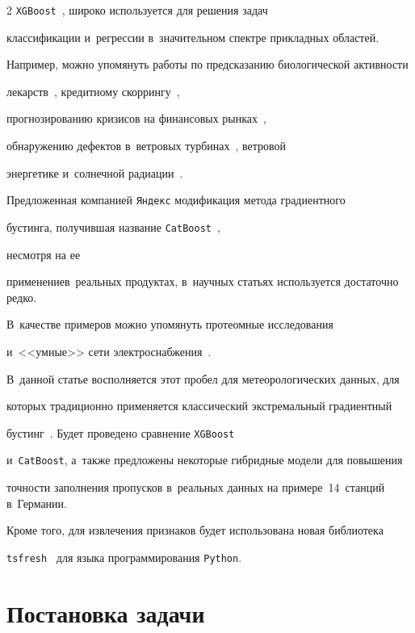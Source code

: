 \begin{multicols}{2}
\verb"XGBoost"~\cite{Chen2016}, широко используется для решения задач 

классификации и~регрессии в~значительном спектре прикладных областей. 

Например, можно упомянуть работы по предсказанию биологической активности 

лекарств~\cite{Mustapha2016}, кредитному скоррингу~\cite{Xia2017}, 

прогнозированию кризисов на финансовых рынках~\cite{Chatzis2018}, 

обнаружению дефектов в~вет\-ро\-вых турбинах~\cite{Zhang2018}, вет\-ро\-вой 

энергетике и~солнечной радиации~\cite{Aler2017,Torres-Barran2018}.



Предложенная компанией \verb"Яндекс" модификация метода градиентного 

бустинга, получившая название \verb"CatBoost"~\cite{Prokhorenkova2018}, 

несмотря на ее 

применение\linebreak в~реальных продуктах, в~научных статьях используется достаточно редко. 

В~качестве примеров можно упомянуть протеомные исследования~\cite{Ivanov2019} 

и~<<умные>> сети электроснабжения~\cite{Punmiya2019}. 

В~данной статье восполняется этот пробел для метеорологических данных, для 

которых традиционно применяется классический экстремальный градиентный 

бустинг~\cite{Korner2018,Fan2018}. Будет проведено сравнение \verb"XGBoost" 

и~\verb"CatBoost", а~также предложены некоторые гибридные модели для повышения 

точ\-ности заполнения пропусков в~реальных данных на примере~14~станций в~Германии. 

Кроме того, для извлечения признаков будет использована новая библиотека 

\verb"tsfresh"~\cite{Christ2018} для языка программирования \verb"Python".



\section{Постановка задачи}






\end{multicols}
